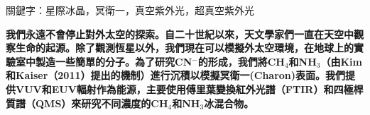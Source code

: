 \begin{abstractcn}

關鍵字：星際冰晶，冥衛一，真空紫外光，超真空紫外光
\vspace{2em}

\textbf{我們永遠不會停止對外太空的探索。自二十世紀以來，天文學家們一直在天空中觀察生命的起源。除了觀測恆星以外，我們現在可以模擬外太空環境，在地球上的實驗室中製造一些簡單的分子。為了研究CN$^-$的形成，我們將CH$_4$和NH$_3$（由Kim和Kaiser（2011）\cite{kim}提出的機制）進行沉積以模擬冥衛一(Charon)表面。我們提供VUV和EUV輻射作為能源，主要使用傅里葉變換紅外光譜（FTIR）和四極桿質譜（QMS）來研究不同濃度的CH$_4$和NH$_3$冰混合物。}

\end{abstractcn} 
